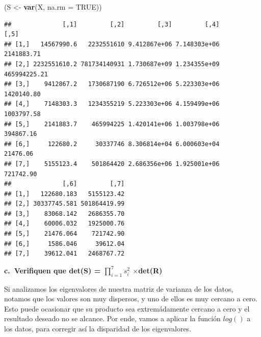\documentclass[
]{article}
\newenvironment{Shaded}{\begin{snugshade}}{\end{snugshade}}
\newcommand{\DataTypeTok}[1]{\textcolor[rgb]{0.13,0.29,0.53}{#1}}
\newcommand{\KeywordTok}[1]{\textcolor[rgb]{0.13,0.29,0.53}{\textbf{#1}}}
\newcommand{\NormalTok}[1]{#1}
\newcommand{\OperatorTok}[1]{\textcolor[rgb]{0.81,0.36,0.00}{\textbf{#1}}}
\newcommand{\OtherTok}[1]{\textcolor[rgb]{0.56,0.35,0.01}{#1}}
\newcommand{\StringTok}[1]{\textcolor[rgb]{0.31,0.60,0.02}{#1}}
\begin{document}
\begin{Shaded}
\begin{Highlighting}[]
\NormalTok{(S <-}\StringTok{ }\KeywordTok{var}\NormalTok{(X, }\DataTypeTok{na.rm =} \OtherTok{TRUE}\NormalTok{))}
\end{Highlighting}
\end{Shaded}

\begin{verbatim}
##              [,1]         [,2]         [,3]         [,4]         [,5]
## [1,]   14567990.6   2232551610 9.412867e+06 7.148303e+06   2141883.71
## [2,] 2232551610.2 781734140931 1.730687e+09 1.234355e+09 465994225.21
## [3,]    9412867.2   1730687190 6.726512e+06 5.223303e+06   1420140.80
## [4,]    7148303.3   1234355219 5.223303e+06 4.159499e+06   1003797.58
## [5,]    2141883.7    465994225 1.420141e+06 1.003798e+06    394867.16
## [6,]     122680.2     30337746 8.306814e+04 6.000603e+04     21476.06
## [7,]    5155123.4    501864420 2.686356e+06 1.925001e+06    721742.90
##              [,6]         [,7]
## [1,]   122680.183   5155123.42
## [2,] 30337745.581 501864419.99
## [3,]    83068.142   2686355.70
## [4,]    60006.032   1925000.76
## [5,]    21476.064    721742.90
## [6,]     1586.046     39612.04
## [7,]    39612.041   2468767.72
\end{verbatim}

\textbf{c.~Verifiquen que det(S) = \(\prod_{i = 1}^{7} s_{i}^2\)
\(\times\)det(R)}

Si analizamos los eigenvalores de nuestra matriz de varianza de los
datos, notamos que los valores son muy dispersos, y uno de ellos es muy
cercano a cero. Esto puede ocasionar que su producto sea extremádamente
cercano a cero y el resultado deseado no se alcance. Por ende, vamos a
aplicar la función \(log()\) a los datos, para corregir así la
disparidad de los eigenvalores.

\begin{Shaded}
\end{Shaded}
\end{document}

